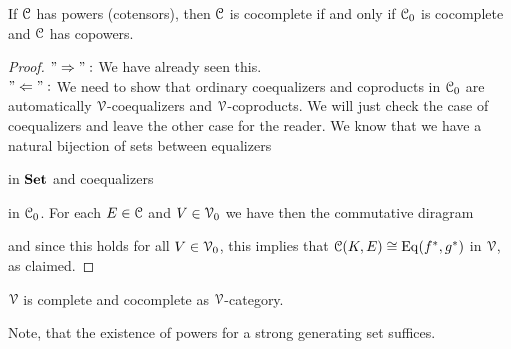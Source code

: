 \documentclass[a4paper,11pt,oneside,openany]{scrbook}
\begin{document}
\begin{prop}
	If $\operatorname{\mathcal{C}}$ has powers (cotensors), then $\operatorname{\mathcal{C}}$ is cocomplete if and only if
    $\operatorname{\mathcal{C}}_{0}$ is cocomplete and $\operatorname{\mathcal{C}}$ has copowers.
\end{prop}

\begin{proof}
	$"\Rightarrow ":$ We have already seen this. \\
	$"\Leftarrow ":$ We need to show that ordinary coequalizers and coproducts
    in $\operatorname{\mathcal{C}}_{0}$ are automatically $\operatorname{\mathcal{V}}$-coequalizers and $\operatorname{\mathcal{V}}$-coproducts. We
    will just check the case of coequalizers and leave the other case for the
    reader. We know that we have a natural bijection of sets between equalizers
	\begin{center}
	\end{center}
	in ${\normalfont\textbf{Set}}$ and coequalizers
	\begin{center}
	\end{center}
	in $\operatorname{\mathcal{C}}_{0}$. For each $E \in \operatorname{\mathcal{C}}$ and $V \in \operatorname{\mathcal{V}}_{0}$ we have then the
    commutative diragram
	\begin{center}
	\end{center}
	and since this holds for all $V \in \operatorname{\mathcal{V}}_{0}$, this implies that $\operatorname{\mathcal{C}}(K,E) \cong \operatorname{Eq}(f^{\ast},g^{\ast})$ in $\operatorname{\mathcal{V}}$, as claimed.
\end{proof}

\begin{cor}
	$\operatorname{\mathcal{V}}$ is complete and cocomplete as $\operatorname{\mathcal{V}}$-category.
\end{cor}

\begin{rmk}
	Note, that the existence of powers for a strong generating set suffices.
\end{rmk}
\end{document}
